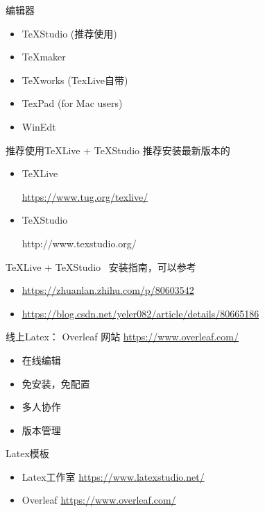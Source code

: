 \documentclass[13pt]{ctexbeamer}
\begin{document}
\begin{frame}{编辑器}
\begin{itemize}
\item  TeXStudio (推荐使用)
\item TeXmaker
\item TeXworks (TexLive自带)
\item TexPad (for Mac users)
\item WinEdt
\end{itemize}
\end{frame}



\begin{frame}{推荐使用TeXLive + TeXStudio }
	推荐安装最新版本的
	
	\begin{itemize}
		\item TeXLive 
		
		\href{https://www.tug.org/texlive/}{https://www.tug.org/texlive/}
		
		
		
		\item TeXStudio
		
		http://www.texstudio.org/
	\end{itemize}
	
	TeXLive + TeXStudio  ~安装指南，可以参考
	\begin{itemize}
		\item 	\href{https://zhuanlan.zhihu.com/p/80603542}{https://zhuanlan.zhihu.com/p/80603542}
		\item \href{https://blog.csdn.net/yeler082/article/details/80665186}{https://blog.csdn.net/yeler082/article/details/80665186}
	\end{itemize}
\end{frame}



\begin{frame}{线上Latex：  Overleaf}
网站 
\href{https://www.overleaf.com/
}{https://www.overleaf.com/
}
\begin{itemize}
\item 在线编辑

\item 免安装，免配置

\item 多人协作

\item 版本管理
\end{itemize}
\end{frame}


\begin{frame}{Latex模板}
\begin{itemize}
    \item Latex工作室  
    \href{https://www.latexstudio.net/}{https://www.latexstudio.net/}
    \item Overleaf 
    \href{https://www.overleaf.com/
}{https://www.overleaf.com/
}
\end{itemize}
    
\end{frame}
\end{document}
